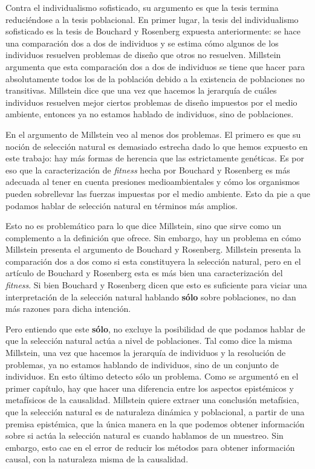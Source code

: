 Contra el individualismo sofisticado, su argumento es que la tesis termina reduciéndose a la tesis poblacional. En primer lugar, la tesis del individualismo sofisticado es la tesis de Bouchard y Rosenberg expuesta anteriormente: se hace una comparación dos a dos de individuos y se estima cómo algunos de los individuos resuelven problemas de diseño que otros no resuelven. Millstein argumenta que esta comparación dos a dos de individuos se tiene que hacer para absolutamente todos los de la población debido a la existencia de poblaciones no transitivas. Millstein dice que una vez que hacemos la jerarquía de cuáles individuos resuelven mejor ciertos problemas de diseño impuestos por el medio ambiente, entonces ya no estamos hablado de individuos, sino de poblaciones.

En el argumento de Millstein veo al menos dos problemas. El primero es que su noción de selección natural es demasiado estrecha dado lo que hemos expuesto en este trabajo: hay más formas de herencia que las estrictamente genéticas. Es por eso que la caracterización de \emph{fitness} hecha por Bouchard y Rosenberg es más adecuada al tener en cuenta presiones medioambientales y cómo los organismos pueden sobrellevar las fuerzas impuestas por el medio ambiente. Esto da pie a que podamos hablar de selección natural en términos más amplios.

Esto no es problemático para lo que dice Millstein, sino que sirve como un complemento a la definición que ofrece. Sin embargo, hay un problema en cómo Millstein presenta el argumento de Bouchard y Rosenberg. Millstein presenta la comparación dos a dos como si esta constituyera la selección natural, pero en el artículo de Bouchard y Rosenberg esta es más bien una caracterización del \emph{fitness}. Si bien Bouchard y Rosenberg dicen que esto es suficiente para viciar una interpretación de la selección natural hablando \textbf{sólo} sobre poblaciones, no dan más razones para dicha intención.

Pero entiendo que este \textbf{sólo}, %
no excluye la posibilidad de que podamos hablar de que la selección natural actúa a nivel de poblaciones. Tal como dice la misma Millstein, una vez que hacemos la jerarquía de individuos y la resolución de problemas, ya no estamos hablando de individuos, sino de un conjunto de individuos. En esto último detecto sólo un problema. Como se argumentó en el primer capítulo, hay que hacer una diferencia entre los aspectos epistémicos y metafísicos de la causalidad. Millstein quiere extraer una conclusión metafísica, que la selección natural es de naturaleza dinámica y poblacional, a partir de una premisa epistémica, que la única manera en la que podemos obtener información sobre si actúa la selección natural es cuando hablamos de un muestreo. Sin embargo, esto cae en el error de reducir los métodos para obtener información causal, con la naturaleza misma de la causalidad.

